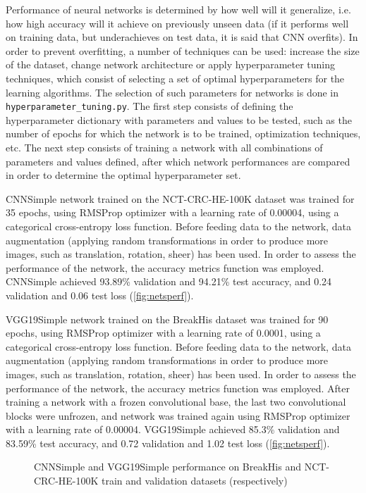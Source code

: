 Performance of neural networks is determined by how well will it generalize, i.e. how high accuracy will it achieve on previously unseen data (if it performs well on training data, but underachieves on test data, it is said that CNN overfits). In order to prevent overfitting, a number of techniques can be used: increase the size of the dataset, change network architecture or apply hyperparameter tuning techniques, which consist of selecting a set of optimal hyperparameters for the learning algorithms. The selection of such parameters for networks is done in \texttt{hyperparameter\_tuning.py}. The first step consists of defining the hyperparameter dictionary with parameters and values to be tested, such as the number of epochs for which the network is to be trained, optimization techniques, etc. The next step consists of training a network with all combinations of parameters and values defined, after which network performances are compared in order to determine the optimal hyperparameter set.

CNNSimple network trained on the NCT-CRC-HE-100K dataset was trained for 35 epochs, using RMSProp optimizer with a learning rate of 0.00004, using a categorical cross-entropy loss function. Before feeding data to the network, data augmentation (applying random transformations in order to produce more images, such as translation, rotation, sheer) has been used. In order to assess the performance of the network, the accuracy metrics function was employed. CNNSimple achieved 93.89\% validation and 94.21\% test accuracy, and 0.24 validation and 0.06 test loss (\textcolor{red}{\autoref{fig:netsperf}}).

VGG19Simple network trained on the BreakHis dataset was trained for 90 epochs, using RMSProp optimizer with a learning rate of 0.0001, using a categorical cross-entropy loss function. Before feeding data to the network, data augmentation (applying random transformations in order to produce more images, such as translation, rotation, sheer) has been used. In order to assess the performance of the network, the accuracy metrics function was employed. After training a network with a frozen convolutional base, the last two convolutional blocks were unfrozen, and network was trained again using RMSProp optimizer with a learning rate of 0.00004. VGG19Simple achieved 85.3\% validation and 83.59\% test accuracy, and 0.72 validation and 1.02 test loss (\textcolor{red}{\autoref{fig:netsperf}}).

\begin{figure}[h]
	\centering
	\caption{CNNSimple and VGG19Simple performance on BreakHis and NCT-CRC-HE-100K train and validation datasets (respectively)}
	\label{fig:netsperf}
\end{figure}

